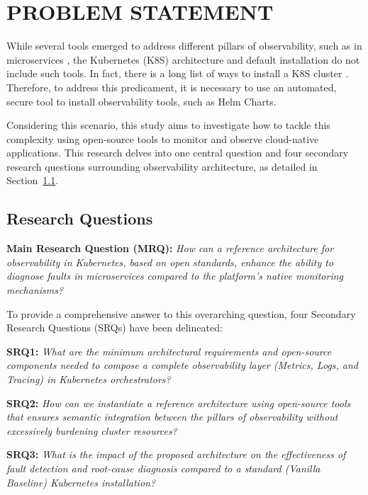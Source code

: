 \section{PROBLEM STATEMENT}
\label{sec:problem}

While several tools emerged to address different pillars of observability, such as in microservices \cite{faseeha_2025}, the Kubernetes (K8S) architecture and default installation \cite{johansson_2022} do not include such tools. In fact, there is a long list of ways to install a K8S cluster \cite{luksa_2018}. Therefore, to address this predicament, it is necessary to use an automated, secure tool to install observability tools, such as Helm Charts.

Considering this scenario, this study aims to investigate how to tackle this complexity using open-source tools to monitor and observe cloud-native applications. This research delves into one central question and four secondary research questions surrounding observability architecture, as detailed in Section~\ref{subsec:research-questions}.

\subsection{Research Questions}
\label{subsec:research-questions}

\textbf{Main Research Question (MRQ):} \textit{How can a reference architecture for observability in Kubernetes, based on open standards, enhance the ability to diagnose faults in microservices compared to the platform's native monitoring mechanisms?}

To provide a comprehensive answer to this overarching question, four Secondary Research Questions (SRQs) have been delineated:

\textbf{SRQ1:} \textit{What are the minimum architectural requirements and open-source components needed to compose a complete observability layer (Metrics, Logs, and Tracing) in Kubernetes orchestrators?}

\textbf{SRQ2:} \textit{How can we instantiate a reference architecture using open-source tools that ensures semantic integration between the pillars of observability without excessively burdening cluster resources?}

\textbf{SRQ3:} \textit{What is the impact of the proposed architecture on the effectiveness of fault detection and root-cause diagnosis compared to a standard (Vanilla Baseline) Kubernetes installation?}

